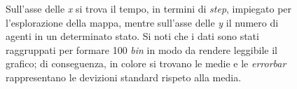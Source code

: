 \begin{figure}
\begin{tabular}{cc}
	\end{tabular}
	\caption{Sull'asse delle \textit{x} si trova il tempo, in termini di \textit{step}, impiegato per l'esplorazione della mappa, mentre sull'asse delle \textit{y} il numero di agenti in un determinato stato. Si noti che i dati sono stati raggruppati per formare 100 \textit{bin} in modo da rendere leggibile il grafico; di conseguenza, in colore si trovano le medie e le \textit{errorbar} rappresentano le devizioni standard rispeto alla media.}
	\label{fig:status}
\end{figure}